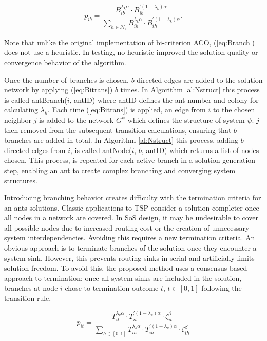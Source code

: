 \documentclass[preprint,12pt]{elsarticle}
\begin{document}
\begin{equation}
p_{ib}=\frac{B_{ib}^{\lambda_k\alpha}\cdot B_{ib}^{'(1-\lambda_k)\alpha}}{\sum_{h\in\mathcal{N}_i}B_{ih}^{\lambda_k\alpha}\cdot B_{ih}^{'(1-\lambda_k)\alpha}}.
\label{eq:Branch}
\end{equation}

\noindent Note that unlike the original implementation of bi-criterion ACO, (\ref{eq:Branch}) does not use a heuristic. In testing, no heuristic improved the solution quality or convergence behavior of the algorithm. 

Once the number of branches is chosen, $b$ directed edges are added to the solution network by applying (\ref{eq:Bitrans}) $b$ times. In Algorithm \ref{al:Nstruct} this process is called antBranch($i$, antID) where antID defines the ant number and colony for calculating $\lambda_k$. Each time (\ref{eq:Bitrans}) is applied, an edge from $i$ to the chosen neighbor $j$ is added to the network $G^\psi$ which defines the structure of system $\psi$. $j$ then removed from the subsequent transition calculations, ensuring that $b$ branches are added in total. In Algorithm \ref{al:Nstruct} this process, adding $b$ directed edges from $i$, is called antNode($i$, $b$, antID) which returns a list of nodes chosen. This process, is repeated for each active branch in a solution generation step, enabling an ant to create complex branching and converging system structures. 

Introducing branching behavior creates difficulty with the termination criteria for an ants solutions. Classic applications to TSP consider a solution completer once all nodes in a network are covered. In SoS design, it may be undesirable to cover all possible nodes due to increased routing cost or the creation of unnecessary system interdependencies. Avoiding this requires a new termination criteria. An obvious approach is to terminate branches of the solution once they encounter a system sink. However, this prevents routing sinks in serial and artificially limits solution freedom. To avoid this, the proposed method uses a consensus-based approach to termination: once all system sinks are included in the solution, branches at node $i$ chose to termination outcome $t$, $t\in[0,1]$ following the transition rule,

\begin{equation}
p_{it}=\frac{T_{it}^{\lambda_k\alpha}\cdot T_{it}^{'(1-\lambda_k)\alpha}\cdot\zeta_{it}^{\beta}}{\sum_{h\in[0,1]}T_{ih}^{\lambda_k\alpha}\cdot T_{ih}^{'(1-\lambda_k)\alpha}\cdot\zeta_{ih}^\beta}
\label{eq:Term}
\end{equation}
\end{document}
